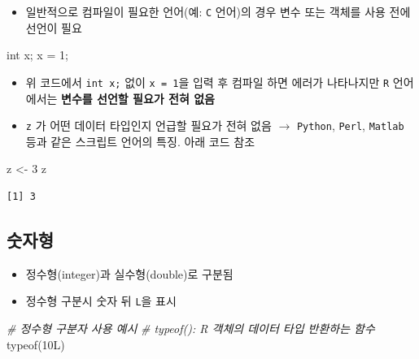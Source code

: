 \documentclass[
  11pt,
]{krantz}
\newenvironment{Shaded}{\begin{snugshade}}{\end{snugshade}}
\newcommand{\CommentTok}[1]{\textcolor[rgb]{0.37,0.37,0.37}{\textit{#1}}}
\newcommand{\DataTypeTok}[1]{\textcolor[rgb]{0.27,0.27,0.27}{#1}}
\newcommand{\DecValTok}[1]{\textcolor[rgb]{0.06,0.06,0.06}{#1}}
\newcommand{\FunctionTok}[1]{\textcolor[rgb]{0,0,0}{#1}}
\newcommand{\NormalTok}[1]{#1}
\newcommand{\OtherTok}[1]{\textcolor[rgb]{0.37,0.37,0.37}{#1}}
\providecommand{\tightlist}{%
  \setlength{\itemsep}{0pt}\setlength{\parskip}{0pt}}
\begin{document}
\begin{itemize}
\tightlist
\item
  일반적으로 컴파일이 필요한 언어(예: \texttt{C} 언어)의 경우 변수 또는 객체를 사용 전에 선언이 필요
\end{itemize}

\footnotesize

\begin{Shaded}
\begin{Highlighting}[]
\DataTypeTok{int}\NormalTok{ x; }
\NormalTok{x = }\DecValTok{1}\NormalTok{;}
\end{Highlighting}
\end{Shaded}

\normalsize

\begin{itemize}
\item
  위 코드에서 \texttt{int\ x;} 없이 \texttt{x\ =\ 1}을 입력 후 컴파일 하면 에러가 나타나지만 \texttt{R} 언어에서는 \textbf{변수를 선언할 필요가 전혀 없음}
\item
  \texttt{z} 가 어떤 데이터 타입인지 언급할 필요가 전혀 없음 \(\rightarrow\) \texttt{Python}, \texttt{Perl}, \texttt{Matlab} 등과 같은 스크립트 언어의 특징. 아래 코드 참조
\end{itemize}

\footnotesize

\begin{Shaded}
\begin{Highlighting}[]
\NormalTok{z }\OtherTok{\textless{}{-}} \DecValTok{3}
\NormalTok{z}
\end{Highlighting}
\end{Shaded}

\begin{verbatim}
[1] 3
\end{verbatim}

\normalsize

\hypertarget{numeric}{%
\subsection{숫자형}\label{numeric}}

\begin{itemize}
\tightlist
\item
  정수형(integer)과 실수형(double)로 구분됨
\item
  정수형 구분시 숫자 뒤 \texttt{L}을 표시
\end{itemize}

\footnotesize

\begin{Shaded}
\begin{Highlighting}[]
\CommentTok{\# 정수형 구분자 사용 예시}
\CommentTok{\# typeof(): R 객체의 데이터 타입 반환하는 함수}
\FunctionTok{typeof}\NormalTok{(10L)}
\end{Highlighting}
\end{Shaded}
\end{document}
